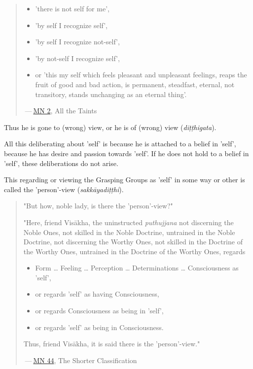 \begin{quotation}
\begin{itemize}
\item 'there is not self for me',

\item 'by self I recognize self',

\item 'by self I recognize not-self',

\item 'by not-self I recognize self',

\item or 'this my self which feels pleasant and unpleasant feelings, reaps the
fruit of good and bad action, is permanent, steadfast, eternal, not
transitory, stands unchanging as an eternal thing'.

\end{itemize}


 — \href{https://suttacentral.net/mn2/en/bodhi}{MN 2}, All the Taints


\end{quotation}

Thus he is gone to (wrong) view, or he is of (wrong) view (\emph{diṭṭhigata}).


All this deliberating about 'self' is because he is attached to a belief
in 'self', because he has desire and passion towards 'self'. If he does
not hold to a belief in 'self', these deliberations do not arise.


This regarding or viewing the Grasping Groups as 'self' in some way or
other is called the 'person'-view (\emph{sakkāyadiṭṭhi}).


\begin{quotation}
"But how, noble lady, is there the 'person'-view?"


"Here, friend Visākha, the uninstructed \emph{puthujjana} not discerning the
Noble Ones, not skilled in the Noble Doctrine, untrained in the Noble
Doctrine, not discerning the Worthy Ones, not skilled in the Doctrine of
the Worthy Ones, untrained in the Doctrine of the Worthy Ones, regards


\begin{itemize}

\item Form … Feeling … Perception … Determinations … Consciousness as 'self',

\item or regards 'self' as having Consciousness,

\item or regards Consciousness as being in 'self',

\item or regards 'self' as being in Consciousness.

\end{itemize}


Thus, friend Visākha, it is said there is the 'person'-view."


 — \href{https://suttacentral.net/mn44/en/sujato}{MN 44}, The Shorter Classification


\end{quotation}

